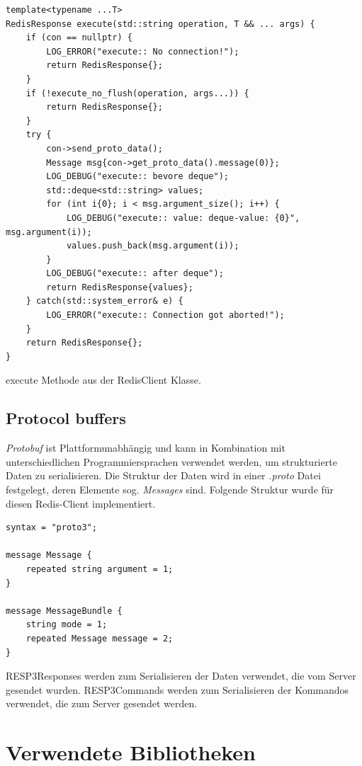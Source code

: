 \documentclass[12pt, letterpaper]{article}
\newenvironment{code}{\captionsetup{type=listing}}{}
\begin{document}
\begin{code}
\begin{verbatim}
template<typename ...T>
RedisResponse execute(std::string operation, T && ... args) {
    if (con == nullptr) {
        LOG_ERROR("execute:: No connection!");
        return RedisResponse{};
    } 
    if (!execute_no_flush(operation, args...)) {
        return RedisResponse{};
    }
    try {
        con->send_proto_data();
        Message msg{con->get_proto_data().message(0)};
        LOG_DEBUG("execute:: bevore deque");
        std::deque<std::string> values;
        for (int i{0}; i < msg.argument_size(); i++) {
            LOG_DEBUG("execute:: value: deque-value: {0}", msg.argument(i));
            values.push_back(msg.argument(i));
        }
        LOG_DEBUG("execute:: after deque");
        return RedisResponse{values};
    } catch(std::system_error& e) {
        LOG_ERROR("execute:: Connection got aborted!");
    }
    return RedisResponse{};
}
\end{verbatim}
\caption{execute Methode aus der RedisClient Klasse.}
\label{resolve_domain}
\end{code}

\subsection{Protocol buffers}\label{sec:proto}
\textit{Protobuf}\cite{protobuf} ist Plattformunabhängig und kann in Kombination mit unterschiedlichen Programmiersprachen verwendet werden, um strukturierte Daten zu serialisieren. Die Struktur der Daten wird in einer \textit{.proto} Datei festgelegt, deren Elemente sog. \textit{Messages} sind. Folgende Struktur wurde für diesen Redis-Client implementiert.
\begin{code}
\begin{verbatim}
syntax = "proto3";

message Message {
    repeated string argument = 1;
}

message MessageBundle {
    string mode = 1;
    repeated Message message = 2;
}
\end{verbatim}
\end{code}
RESP3Responses werden zum Serialisieren der Daten verwendet, die vom Server gesendet wurden. RESP3Commands werden zum Serialisieren der Kommandos verwendet, die zum Server gesendet werden.

\section{Verwendete Bibliotheken}
\label{sec:biblio}
\end{document}
